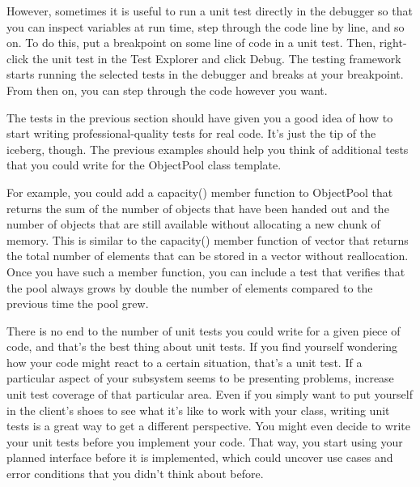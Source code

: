 However, sometimes it is useful to run a unit test directly in the debugger so that you can inspect variables at run time, step through the code line by line, and so on. To do this, put a breakpoint on some line of code in a unit test. Then, right-click the unit test in the Test Explorer and click Debug. The testing framework starts running the selected tests in the debugger and breaks at your breakpoint. From then on, you can step through the code however you want.


The tests in the previous section should have given you a good idea of how to start writing professional-quality tests for real code. It’s just the tip of the iceberg, though. The previous examples should help you think of additional tests that you could write for the ObjectPool class template.

For example, you could add a capacity() member function to ObjectPool that returns the sum of the number of objects that have been handed out and the number of objects that are still available without allocating a new chunk of memory. This is similar to the capacity() member function of vector that returns the total number of elements that can be stored in a vector without reallocation. Once you have such a member function, you can include a test that verifies that the pool always grows by double the number of elements compared to the previous time the pool grew.

There is no end to the number of unit tests you could write for a given piece of code, and that’s the best thing about unit tests. If you find yourself wondering how your code might react to a certain situation, that’s a unit test. If a particular aspect of your subsystem seems to be presenting problems, increase unit test coverage of that particular area. Even if you simply want to put yourself in the client’s shoes to see what it’s like to work with your class, writing unit tests is a great way to get a different perspective. You might even decide to write your unit tests before you implement your code. That way, you start using your planned interface before it is implemented, which could uncover use cases and error conditions that you didn’t think about before.



















